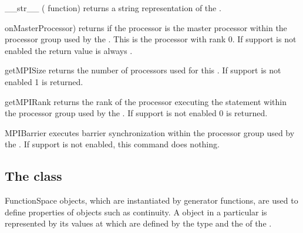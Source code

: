 %
\begin{methoddesc}[Domain]{__str__}{}
    (\PYTHON {} function) returns a string representation of the
    \Domain.
\end{methoddesc}
%
\begin{methoddesc}[Domain]{onMasterProcessor)}{}
    returns \True if the processor is the master processor within the \MPI
    processor group used by the \Domain. This is the processor with rank 0.
    If \MPI support is not enabled the return value is always \True.
\end{methoddesc}
%
\begin{methoddesc}[Domain]{getMPISize}{}
    returns the number of \MPI processors used for this \Domain. If \MPI
    support is not enabled 1 is returned.
\end{methoddesc}
%
\begin{methoddesc}[Domain]{getMPIRank}{}
    returns the rank of the processor executing the statement within the
    \MPI processor group used by the \Domain. If \MPI support is not enabled
    0 is returned.
\end{methoddesc}
%
\begin{methoddesc}[Domain]{MPIBarrier}{}
    executes barrier synchronization within the \MPI processor group used by
    the \Domain. If \MPI support is not enabled, this command does nothing.
\end{methoddesc}

\subsection{The \FunctionSpace class}
\begin{classdesc}{FunctionSpace}{}
\FunctionSpace objects, which are instantiated by generator functions, are
used to define properties of \Data objects such as continuity.
A \Data object in a particular \FunctionSpace is represented by its values at
\DataSamplePoints which are defined by the type and the \Domain of the \FunctionSpace.
\end{classdesc}

